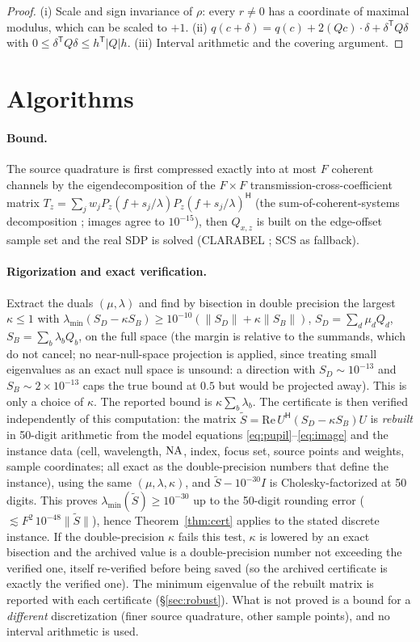 \documentclass[11pt,a4paper]{article}
\theoremstyle{remark}\newtheorem*{remark}{Remark}
\begin{document}
\begin{proof}
(i) Scale and sign invariance of $\rho$: every $r\ne0$ has a coordinate of maximal modulus, which can be scaled to $+1$. (ii) $q(c+\delta)=q(c)+2(Qc)\cdot\delta+\delta^{\mathsf T}Q\delta$ with $0\le\delta^{\mathsf T}Q\delta\le h^{\mathsf T}|Q|h$. (iii) Interval arithmetic and the covering argument.
\end{proof}

\section{Algorithms}\label{sec:alg}
\paragraph{Bound.} The source quadrature is first compressed exactly into at most $F$ coherent channels by the eigendecomposition of the $F\times F$ transmission-cross-coefficient matrix $T_z=\sum_jw_jP_z(f+s_j/\lambda)P_z(f+s_j/\lambda)^{\mathsf H}$ (the sum-of-coherent-systems decomposition \cite{pati1994}; images agree to $10^{-15}$), then $Q_{x,z}$ is built on the edge-offset sample set and the real SDP is solved (CLARABEL \cite{clarabel}; SCS \cite{scs} as fallback).
\paragraph{Rigorization and exact verification.} Extract the duals $(\mu,\lambda)$ and find by bisection in double precision the largest $\kappa\le1$ with $\lambda_{\min}(S_D-\kappa S_B)\ge10^{-10}(\|S_D\|+\kappa\|S_B\|)$, $S_D=\sum_d\mu_dQ_d$, $S_B=\sum_b\lambda_bQ_b$, on the full space (the margin is relative to the summands, which do not cancel; no near-null-space projection is applied, since treating small eigenvalues as an exact null space is unsound: a direction with $S_D\sim10^{-13}$ and $S_B\sim2\times10^{-13}$ caps the true bound at $0.5$ but would be projected away). This is only a choice of $\kappa$. The reported bound is $\kappa\sum_b\lambda_b$. The certificate is then verified independently of this computation: the matrix $\tilde S=\mathrm{Re}\,U^{\mathsf H}(S_D-\kappa S_B)U$ is \emph{rebuilt} in 50-digit arithmetic from the model equations \eqref{eq:pupil}--\eqref{eq:image} and the instance data (cell, wavelength, $\mathrm{NA}$, index, focus set, source points and weights, sample coordinates; all exact as the double-precision numbers that define the instance), using the same $(\mu,\lambda,\kappa)$, and $\tilde S-10^{-30}I$ is Cholesky-factorized at 50 digits. This proves $\lambda_{\min}(\tilde S)\ge10^{-30}$ up to the 50-digit rounding error ($\lesssim F^2\,10^{-48}\|\tilde S\|$), hence Theorem~\ref{thm:cert} applies to the stated discrete instance. If the double-precision $\kappa$ fails this test, $\kappa$ is lowered by an exact bisection and the archived value is a double-precision number not exceeding the verified one, itself re-verified before being saved (so the archived certificate is exactly the verified one). The minimum eigenvalue of the rebuilt matrix is reported with each certificate (\S\ref{sec:robust}). What is not proved is a bound for a \emph{different} discretization (finer source quadrature, other sample points), and no interval arithmetic is used.
\end{document}
